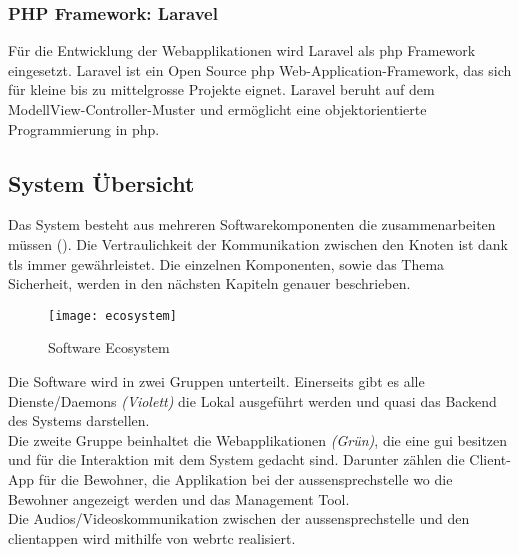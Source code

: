 \subsubsection{PHP Framework: Laravel}
Für die Entwicklung der Webapplikationen wird Laravel als \gls{php} Framework eingesetzt. Laravel ist ein Open Source \gls{php} Web-Application-Framework, das sich für kleine bis zu mittelgrosse Projekte eignet. Laravel beruht auf dem ModellView-Controller-Muster und ermöglicht eine objektorientierte Programmierung in \gls{php}.

\subsection{System Übersicht}
Das System besteht aus mehreren Softwarekomponenten die zusammenarbeiten müssen (). Die Vertraulichkeit der Kommunikation zwischen den Knoten ist dank \gls{tls} immer gewährleistet. Die einzelnen Komponenten, sowie das Thema Sicherheit, werden in den nächsten Kapiteln genauer beschrieben.

\begin{figure}[htb!]
	\begin{center}
		\texttt{[image: ecosystem]}
		\caption[Software Ecosystem]{Software Ecosystem}
		\label{fig:echosystem}
	\end{center}
\end{figure}

Die Software wird in zwei Gruppen unterteilt. Einerseits gibt es alle Dienste/Daemons \textit{(Violett)} die Lokal ausgeführt werden und quasi das Backend des Systems darstellen.
\\
Die zweite Gruppe beinhaltet die Webapplikationen \textit{(Grün)}, die eine \gls{gui} besitzen und für die Interaktion mit dem System gedacht sind. Darunter zählen die Client-App für die Bewohner, die Applikation bei der \gls{aussensprechstelle} wo die Bewohner angezeigt werden und das Management Tool.
\\
Die Audios/Videoskommunikation zwischen der \gls{aussensprechstelle} und den \gls{clientapp}en wird mithilfe von \gls{webrtc} realisiert. 

